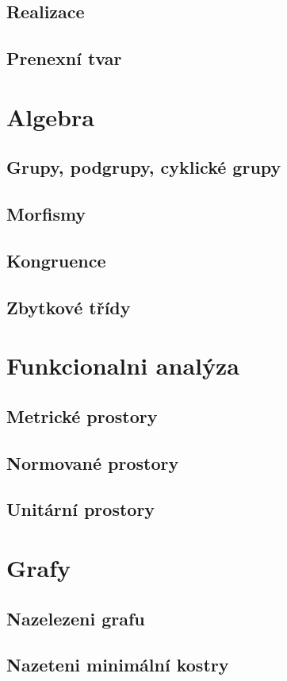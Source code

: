 \documentclass[12pt,a4paper,notitlepage,final]{article}
\begin{document}
\subsection{Realizace}                      
\subsection{Prenexní tvar}                 

\section{Algebra}
\subsection{Grupy, podgrupy, cyklické grupy}  
\subsection{Morfismy}                       
\subsection{Kongruence}                    
\subsection{Zbytkové třídy}               

\section{Funkcionalni analýza}
\subsection{Metrické prostory}           
\subsection{Normované prostory}         
\subsection{Unitární prostory}         

\section{Grafy}
\subsection{Nazelezeni grafu}         
\subsection{Nazeteni minimální kostry}
\end{document}
